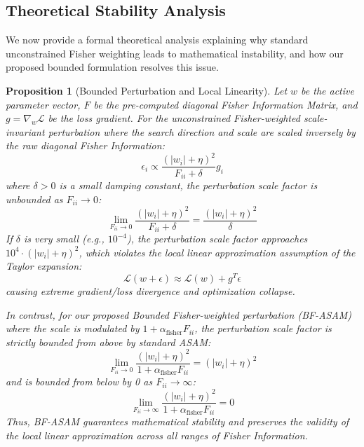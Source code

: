 \documentclass{article}
\theoremstyle{plain}
\newtheorem{proposition}[theorem]{Proposition}
\theoremstyle{definition}
\theoremstyle{remark}
\begin{document}
\subsection{Theoretical Stability Analysis}
\label{sec:theory}
We now provide a formal theoretical analysis explaining why standard unconstrained Fisher weighting leads to mathematical instability, and how our proposed bounded formulation resolves this issue.

\begin{proposition}[Bounded Perturbation and Local Linearity]
Let $w$ be the active parameter vector, $F$ be the pre-computed diagonal Fisher Information Matrix, and $g = \nabla_w \mathcal{L}$ be the loss gradient.
For the unconstrained Fisher-weighted scale-invariant perturbation where the search direction and scale are scaled inversely by the raw diagonal Fisher Information:
\begin{equation}
    \epsilon_i \propto \frac{(|w_i| + \eta)^2}{F_{ii} + \delta} g_i
\end{equation}
where $\delta > 0$ is a small damping constant, the perturbation scale factor is unbounded as $F_{ii} \to 0$:
\begin{equation}
    \lim_{F_{ii} \to 0} \frac{(|w_i| + \eta)^2}{F_{ii} + \delta} = \frac{(|w_i| + \eta)^2}{\delta}
\end{equation}
If $\delta$ is very small (e.g., $10^{-4}$), the perturbation scale factor approaches $10^4 \cdot (|w_i| + \eta)^2$, which violates the local linear approximation assumption of the Taylor expansion:
\begin{equation}
    \mathcal{L}(w + \epsilon) \approx \mathcal{L}(w) + g^T \epsilon
\end{equation}
causing extreme gradient/loss divergence and optimization collapse.

In contrast, for our proposed Bounded Fisher-weighted perturbation (BF-ASAM) where the scale is modulated by $1 + \alpha_{\text{fisher}} F_{ii}$, the perturbation scale factor is strictly bounded from above by standard ASAM:
\begin{equation}
    \lim_{F_{ii} \to 0} \frac{(|w_i| + \eta)^2}{1 + \alpha_{\text{fisher}} F_{ii}} = (|w_i| + \eta)^2
\end{equation}
and is bounded from below by 0 as $F_{ii} \to \infty$:
\begin{equation}
    \lim_{F_{ii} \to \infty} \frac{(|w_i| + \eta)^2}{1 + \alpha_{\text{fisher}} F_{ii}} = 0
\end{equation}
Thus, BF-ASAM guarantees mathematical stability and preserves the validity of the local linear approximation across all ranges of Fisher Information.
\end{proposition}
\end{document}
